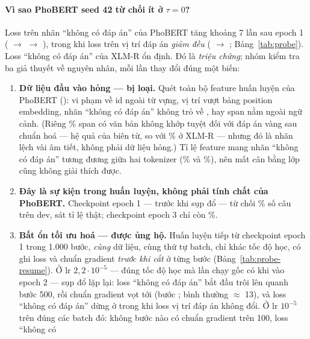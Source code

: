 \paragraph{Vì sao PhoBERT seed 42 từ chối ít ở $\tau = 0$?} Loss trên nhãn ``không có đáp án'' của PhoBERT tăng
khoảng 7 lần sau epoch 1 (\ProbePhobertRunAClsOne{} $\to$ \ProbePhobertRunAClsTwo{} $\to$
\ProbePhobertRunAClsThree), trong khi loss trên vị trí đáp án \emph{giảm đều}
(\ProbePhobertRunASpanOne{} $\to$ \ProbePhobertRunASpanThree; Bảng~\ref{tab:probe}). Loss ``không có đáp án''
của XLM-R ổn định. Đó là \emph{triệu chứng}; nhóm kiểm tra ba giả thuyết về nguyên nhân, mỗi lần thay đổi đúng
một biến:

\begin{enumerate}
  \item \textbf{Dữ liệu đầu vào hỏng --- bị loại.} Quét toàn bộ \ScanPhobertFeatures{} feature huấn luyện của
        PhoBERT (): \ScanPhobertViolations{} vi phạm về id ngoài từ vựng, vị trí
        vượt bảng position embedding, nhãn ``không có đáp án'' không trỏ về , hay span nằm ngoài ngữ
        cảnh. (Riêng \ScanPhobertMismatchPct\% span có văn bản không khớp tuyệt đối với đáp án vàng sau chuẩn
        hoá --- hệ quả của biên từ, so với \ScanXlmrMismatchPct\% ở XLM-R --- nhưng đó là nhãn lệch vài âm tiết,
        không phải dữ liệu hỏng.) Tỉ lệ feature mang nhãn ``không có đáp án'' tương đương giữa hai tokenizer
        (\ScanPhobertClsFrac\% và \ScanXlmrClsFrac\%), nên mất cân bằng lớp cũng không giải thích được.
  \item \textbf{Đây là sự kiện trong huấn luyện, không phải tính chất của PhoBERT.} Checkpoint epoch 1 --- trước
        khi sụp đổ --- từ chối \DevEpochOneAbsRate\% số câu trên dev, sát tỉ lệ thật; checkpoint epoch 3 chỉ
        còn \DevRunAAbsRate\%.
  \item \textbf{Bất ổn tối ưu hoá --- được ủng hộ.} Huấn luyện tiếp từ checkpoint epoch 1 trong 1.000 bước,
        \emph{cùng} dữ liệu, cùng thứ tự batch, chỉ khác tốc độ học, có ghi loss và chuẩn gradient \emph{trước
        khi cắt} ở từng bước (Bảng~\ref{tab:probe-resume}). Ở lr $2{,}2\cdot10^{-5}$ --- đúng tốc độ học mà lần
        chạy gốc có khi vào epoch 2 --- sụp đổ lặp lại: loss ``không có đáp án'' bắt đầu trôi lên quanh bước
        500, rồi chuẩn gradient vọt tới \ResumeHighMaxSpike{} (bước \ResumeHighMaxSpikeStep; bình thường
        $\approx$ 13), và loss ``không có đáp án'' dừng ở \ResumeHighClsEnd{} trong khi loss vị trí đáp án không
        đổi. Ở lr $10^{-5}$ trên đúng các batch đó: không bước nào có chuẩn gradient trên 100, loss ``không có

\end{enumerate}
